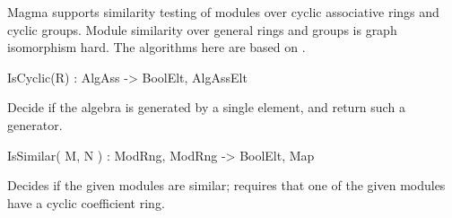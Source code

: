 
Magma supports similarity testing of modules over cyclic associative rings and cyclic groups.
Module similarity over general rings and groups is graph isomorphism hard.  The algorithms
here are based on \cite{BW:Module-iso}.

\begin{intrinsics}
IsCyclic(R) : AlgAss  -> BoolElt, AlgAssElt
\end{intrinsics}

Decide if the algebra is generated by a single element, and return such a generator.

\begin{intrinsics}
IsSimilar( M, N ) : ModRng, ModRng -> BoolElt, Map
\end{intrinsics}

Decides if the given modules are similar; requires that one of the given modules have a cyclic coefficient ring.

